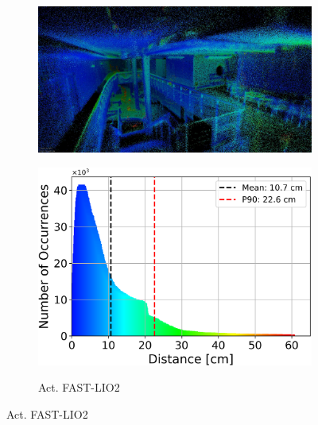 \documentclass[english, bachelor, utf8]{base/thesis_telematics}
\begin{document}
\begin{figure}
    \centering
\begin{subfigure}{0.4\textwidth}
    \centering
    \includegraphics[width=\textwidth]{pics/results_images/a_lio.jpg}
    \label{fig:results_act_lio}
\end{subfigure}

\begin{subfigure}{0.4\textwidth}
    \centering
    \includegraphics[width=\textwidth]{pics/histogram_results/histogram_cond_actuated_lio.png}
    \label{fig:hist_act_lio}
    \vspace{-5mm}
    \caption{Act. FAST-LIO2}
\end{subfigure}
\vspace{4mm}


\end{figure}
\end{document}
